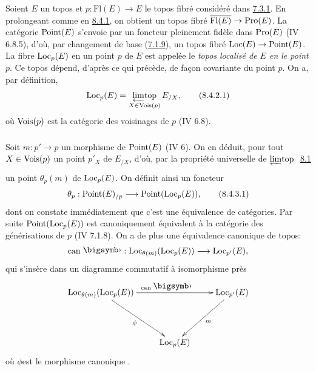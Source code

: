 \documentclass[10pt]{../fichiers-configuration-latex/smfart}
\begin{document}
Soient $E$ un topos et $p : \text{Fl}(E) \to E$ le topos fibré
considéré dans \hyperref[VI.exem7.3.1]{7.3.1}. En prolongeant comme en
\hyperref[VI.subsubsec8.4.1]{8.4.1}, on obtient un topos fibré
$\bar{\text{Fl}(E)} \to \Pro(E)$. La catégorie $\operatorname{Point}(E)$ s'envoie
par un foncteur pleinement fidèle dans $\operatorname{Pro}(E)$ (IV 6.8.5),
d'où, par changement de base (\hyperref[VI.subsubsec7.1.9]{7.1.9}), un topos
fibré $\Loc(E) \to \Point(E)$. La fibre $\operatorname{Loc}_p(E)$ en un point $p$
de $E$ est appelée le \emph{topos
  localisé de $E$ en le point} $p$. Ce topos dépend, d'après ce qui
précède, de façon covariante du point $p$. On a, par définition,
\begin{equation*}
\operatorname{Loc}_p(E) = \mathop{\varprojlim\!\mbox{\rm top}}_{X \in \operatorname{Vois}(p)} E_{/X}{},\tag{8.4.2.1}
\end{equation*}
où $\operatorname{Vois}(p)$ est la catégorie des voisinages de $p$ (IV 6.8).

\subsubsection{}

Soit $m : p'\to p$ un morphisme de $\operatorname{Point}(E)$ (IV 6). On en déduit,
pour tout $X \in \operatorname{Vois}(p)$ un point $p'_X$ de $E_{/X}$, d'où, par la
propriété universelle de ${\displaystyle{\varprojlim_{}\!\mbox{\rm top }}}$ \hyperref[VI.subsec8.1]{8.1} un point
$\theta_p(m)$ de $\operatorname{Loc}_p(E)$. On définit ainsi un foncteur
\begin{equation*}
\theta_p : \Point(E)_{/p} \to \Point(\Loc_p (E)){\quoi},\tag{8.4.3.1}
\end{equation*}
dont on constate immédiatement que c'est une équivalence de
catégories. Par suite $\operatorname{Point}(\operatorname{Loc}_p(E))$ est canoniquement équivalent
à la catégorie des générisations de $p$ (IV 7.1.8). On a de plus une
équivalence canonique de topos:
$$
\can \bigdot : \Loc_{\theta(m)} (\Loc_p (E)) \to \Loc_{p'} (E){\quoi},
$$
qui s'insère dans un diagramme commutatif à isomorphisme près
\[
\xymatrix@R=1.5cm{
\Loc_{\theta(m)} (\Loc_p(E))  \ar[rr]^{\can\bigdot} \ar[rd]_{\phi}  &&\Loc_{p'}(E)\ar[ld]^{m}\\
                                  & \Loc_p (E)   &       \\
}
\]
où $\phi$\pageoriginale est le morphisme canonique .

\subsubsection{}
\end{document}
